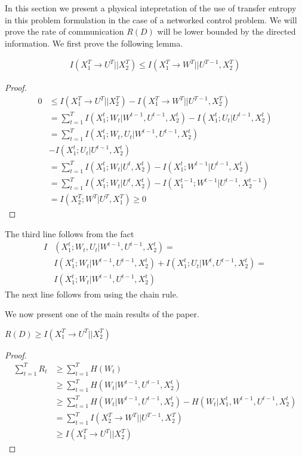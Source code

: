 In this section we present a physical intepretation of the use of transfer entropy in this problem formulation in the case of a networked control problem. We will prove the rate of communication $R(D)$ will be lower bounded by the directed information. We first prove the following lemma.
\begin{lemma}
\begin{align}
I(X_1^T \rightarrow U^T || X_2^T) \leq I(X_1^T \rightarrow W^T || U^{T-1},X_2^T)
\end{align}
\end{lemma}
\begin{proof}
\begin{align*}
0 &\leq I(X_1^T \rightarrow U^T || X_2^T) - I(X_1^T \rightarrow W^T || U^{T-1},X_2^T) \\
& = \sum_{t=1}^T I\left(X_1^t;W_t|W^{t-1},U^{t-1},X_2^t \right) - I\left(X_1^t;U_t|U^{t-1},X_2^t \right)\\
& = \sum_{t=1}^T I\left(X_1^t;W_t,U_t|W^{t-1},U^{t-1},X_2^t \right) \\&- I\left(X_1^t;U_t|U^{t-1},X_2^t \right)\\
& = \sum_{t=1}^T I\left(X_1^t;W_t|U^{t},X_2^t \right) - I\left(X_1^t;W^{t-1}|U^{t-1},X_2^t \right)\\
& = \sum_{t=1}^T I\left(X_1^t;W_t|U^{t},X_2^t \right) - I\left(X_1^{t-1};W^{t-1}|U^{t-1},X_2^{t-1} \right)\\
& = I\left(X_2^T;W^T | U^T,X_1^T \right) \geq 0 
\end{align*}
\end{proof}
The third line follows from the fact 
\begin{align*}
 I & \left(X_1^t;W_t,U_t| W^{t-1},U^{t-1}, X_2^t \right) =  \\ & I\left(X_1^t;W_t|W^{t-1},U^{t-1},X_2^t \right) + I\left(X_1^t;U_t|W^{t},U^{t-1},X_2^t \right) = \\ & I\left(X_1^t;W_t|W^{t-1},U^{t-1},X_2^t \right)
\end{align*}
The next line follows from using the chain rule. 

We now present one of the main results of the paper. 
\begin{theorem}
$R(D) \geq I(X_1^T \rightarrow U^T || X_2^T)$
\end{theorem}

\begin{proof}
\begin{align*}
\sum_{t=1}^T R_t &\geq \sum_{t=1}^T H(W_t)\\
&\geq \sum_{t=1}^T H(W_t\vert W^{t-1},U^{t-1},X_2^t)\\
&\geq \sum_{t=1}^T H(W_t\vert W^{t-1},U^{t-1},X_2^t) - H(W_t\vert X_1^t, W^{t-1},U^{t-1},X_2^t)\\
& =  \sum_{t=1}^T I \left(X_2^T \rightarrow W^T \vert \vert U^{T-1},X_2^{T} \right)\\
& \geq I \left(X_1^T \rightarrow U^T \vert \vert X_2^T \right)
\end{align*}
\end{proof}